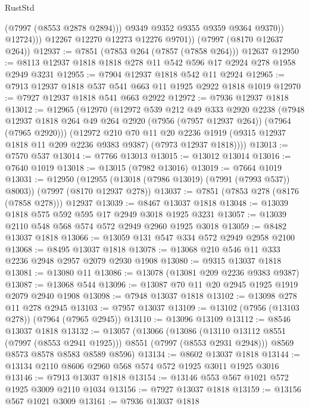 \begin{lexlean}{RustStd}
\begin{coremodule}
                    (@7997 (@8553 @2878 @2894)))
                  @9349
                  @9352
                  @9355
                  @9359
                  @9364
                  @9370))
              @12724)))
        @12267
        @12270
        @12273
        @12276
        @9701))
    (@7997 (@8170 @12637 @264))
@12937 := @7851 (@7853 @264 (@7857 (@7858 @264))) @12637
@12950 := @8113 @12937 @1818 @1818 @278 @11 @542 @596 @17 @2924 @278 @1958 @2949 @3231
@12955 := @7904 @12937 @1818 @542 @11 @2924
@12965 := @7913 @12937 @1818 @537 @541 @663 @11 @1925 @2922 @1818 @1019
@12970 := @7927 @12937 @1818 @541 @663 @2922
@12972 := @7936 @12937 @1818
@13012 := @12965
    (@12970
      (@12972
        @539
        @212
        @49
        @333
        @2920
        @2238
        (@7948 @12937 @1818 @264 @49 @264 @2920 (@7956 (@7957 @12937 @264)) (@7964 (@7965 @2920)))
        (@12972
          @210
          @70
          @11
          @20
          @2236
          @1919
          (@9315 @12937 @1818 @11 @209 @2236 @9383 @9387)
          (@7973 @12937 @1818))))
@13013 := @7570 @537
@13014 := @7766 @13013
@13015 := @13012 @13014
@13016 := @7640 @1019
@13018 := @13015 (@7982 @13016)
@13019 := @7664 @1019
@13031 := @12950
    (@12955 (@13018 (@7986 @13019) (@7991 (@7993 @537)) @8003))
    (@7997 (@8170 @12937 @278))
@13037 := @7851 (@7853 @278 (@8176 (@7858 @278))) @12937
@13039 := @8467 @13037 @1818
@13048 := @13039 @1818 @575 @592 @595 @17 @2949 @3018 @1925 @3231
@13057 := @13039 @2110 @548 @568 @574 @572 @2949 @2960 @1925 @3018
@13059 := @8482 @13037 @1818
@13066 := @13059 @131 @547 @334 @572 @2949 @2958 @2100
@13068 := @8495 @13037 @1818
@13078 := @13068 @210 @546 @11 @333 @2236 @2948 @2957 @2079 @2930 @1908
@13080 := @9315 @13037 @1818
@13081 := @13080 @11
@13086 := @13078 (@13081 @209 @2236 @9383 @9387)
@13087 := @13068 @544
@13096 := @13087 @70 @11 @20 @2945 @1925 @1919 @2079 @2940 @1908
@13098 := @7948 @13037 @1818
@13102 := @13098 @278 @11 @278 @2945
@13103 := @7957 @13037
@13109 := @13102 (@7956 (@13103 @278)) (@7964 (@7965 @2945))
@13110 := @13096 @13109
@13112 := @8546 @13037 @1818
@13132 := @13057
    (@13066
      (@13086 (@13110 @13112 @8551 (@7997 (@8553 @2941 @1925))) @8551 (@7997 (@8553 @2931 @2948)))
      @8569
      @8573
      @8578
      @8583
      @8589
      @8596)
@13134 := @8602 @13037 @1818
@13144 := @13134 @2110 @8606 @2960 @568 @574 @572 @1925 @3011 @1925 @3016
@13146 := @7913 @13037 @1818
@13154 := @13146 @553 @567 @1021 @572 @1925 @3009 @2110 @1034
@13156 := @7927 @13037 @1818
@13159 := @13156 @567 @1021 @3009
@13161 := @7936 @13037 @1818

\end{coremodule}
\end{lexlean}

